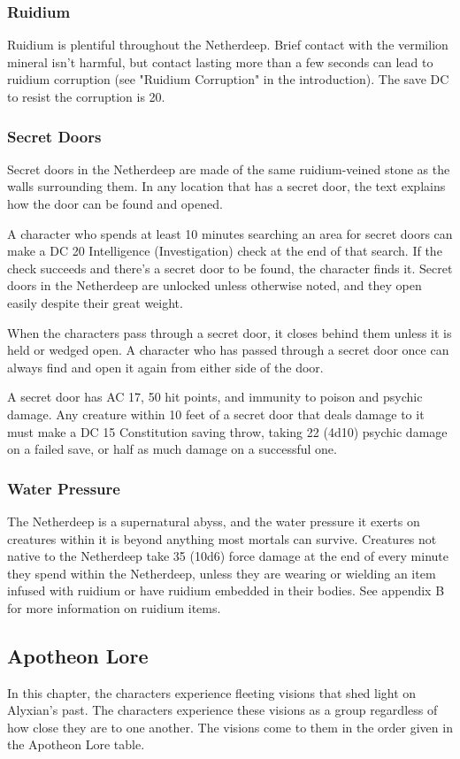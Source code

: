 \documentclass[10pt,a4paper,twoside,fancy,bg=print,twocolumn,openany,nodeprecatedcode]{dndbook}
\begin{document}
\subsubsection{Ruidium}
Ruidium is plentiful throughout the Netherdeep. Brief contact with the vermilion mineral isn't harmful, but contact lasting more than a few seconds can lead to ruidium corruption (see "Ruidium Corruption" in the introduction). The save DC to resist the corruption is 20.

\subsubsection{Secret Doors}
Secret doors in the Netherdeep are made of the same ruidium-veined stone as the walls surrounding them. In any location that has a secret door, the text explains how the door can be found and opened.

A character who spends at least 10 minutes searching an area for secret doors can make a DC 20 Intelligence (Investigation) check at the end of that search. If the check succeeds and there's a secret door to be found, the character finds it. Secret doors in the Netherdeep are unlocked unless otherwise noted, and they open easily despite their great weight.

When the characters pass through a secret door, it closes behind them unless it is held or wedged open. A character who has passed through a secret door once can always find and open it again from either side of the door.

A secret door has AC 17, 50 hit points, and immunity to poison and psychic damage. Any creature within 10 feet of a secret door that deals damage to it must make a DC 15 Constitution saving throw, taking 22 (4d10) psychic damage on a failed save, or half as much damage on a successful one.

\subsubsection{Water Pressure}
The Netherdeep is a supernatural abyss, and the water pressure it exerts on creatures within it is beyond anything most mortals can survive. Creatures not native to the Netherdeep take 35 (10d6) force damage at the end of every minute they spend within the Netherdeep, unless they are wearing or wielding an item infused with ruidium or have ruidium embedded in their bodies. See appendix B for more information on ruidium items.

\subsection{Apotheon Lore}
In this chapter, the characters experience fleeting visions that shed light on Alyxian's past. The characters experience these visions as a group regardless of how close they are to one another. The visions come to them in the order given in the Apotheon Lore table.
\end{document}
